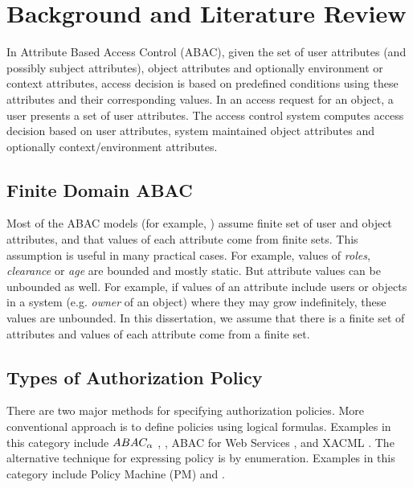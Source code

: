 \chapter{Background and Literature Review}
\label{sec:related-work}
In Attribute Based Access Control (ABAC), given the set of user attributes (and possibly subject attributes), object attributes and optionally environment or context attributes, access decision  is based on predefined conditions using these attributes and their corresponding values. In an access request for an object, a user presents a set of user attributes. The access control system computes access  decision based on user attributes, system maintained object attributes and optionally context/environment attributes. 


\section{Finite Domain ABAC}
	Most of the ABAC models (for example, \cite{abacAlpha,hgabac,abac-ws,abac-for-web-service}) assume finite set of user and  object attributes, and that values of each attribute come from finite sets. This assumption is useful in many practical cases. For example, values of \textit{roles}, \textit{clearance} or \textit{age} are bounded and mostly static. But attribute values can be unbounded as well. For example, if values of an attribute include users or objects in a system  (e.g. \textit{owner} of an object) where they may grow indefinitely, these values are unbounded.  In this dissertation, we assume that there is a finite set of attributes and values of each attribute come from a finite set.
	
\section{Types of Authorization Policy}
	There are two major methods for specifying authorization policies. More conventional approach is to define policies using logical formulas. Examples in this category include $ABAC_\alpha${} \cite{abacAlpha}, \hgabac{} \cite{hgabac}, ABAC for Web Services \cite{abac-for-web-service}, and XACML \cite{xacml}. The alternative technique for expressing policy is by enumeration. Examples in this category include Policy Machine (PM) \cite{policy-machine} and \twoSortedRBAC{} \cite{two-sorted-rbac}.
	
